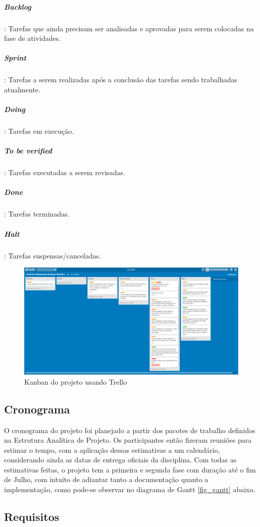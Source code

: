 	\subparagraph{Backlog}: Tarefas que ainda precisam ser analisadas e aprovadas para serem colocadas na fase de atividades.
	\subparagraph{Sprint}: Tarefas a serem realizadas após a conclusão das tarefas sendo trabalhadas atualmente.
	\subparagraph{Doing}: Tarefas em execução.
	\subparagraph{To be verified}: Tarefas executadas a serem revisadas.
	\subparagraph{Done}: Tarefas terminadas.
	\subparagraph{Halt}: Tarefas suspensas/canceladas.

		\begin{figure}[h!]
		\caption{\label{fig_trello} Kanban do projeto usando Trello }
		\begin{center}
	\includegraphics[width=\textwidth]{trello.png}	
	\end{center}
	\end{figure}
	
	
	\subsection{Cronograma}\label{subsec-cronograma}
	
	O cronograma do projeto foi planejado a partir dos pacotes de trabalho definidos na Estrutura Analítica de Projeto. Os participantes então fizeram reuniões para estimar o tempo, com a aplicação dessas estimativas a um calendário, considerando ainda as datas de entrega oficiais da disciplina. Com todas as estimativas feitas, o projeto tem a primeira e segunda fase com duração até o fim de Julho, com intuito de adiantar tanto a documentação quanto a implementação, como pode-se observar no diagrama de Gantt  \autoref{fig_gantt} abaixo.
	
	
	\subsection{Requisitos}\label{subsec-requisitos}
	
